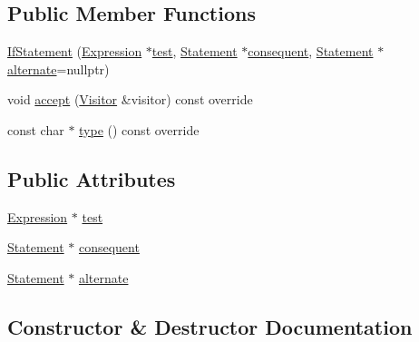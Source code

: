 \subsection*{Public Member Functions}
\begin{DoxyCompactItemize}
\item 
\hyperlink{struct_if_statement_aa34756942dc6b3c68abd60f697ea2237}{If\+Statement} (\hyperlink{struct_expression}{Expression} $\ast$\hyperlink{struct_if_statement_ab7d44c6a4d1e70ab2d1053a2b076b8df}{test}, \hyperlink{struct_statement}{Statement} $\ast$\hyperlink{struct_if_statement_a83d873df742779675de067315792ff8a}{consequent}, \hyperlink{struct_statement}{Statement} $\ast$\hyperlink{struct_if_statement_ab0ee82460f6279444d526b2fff26584b}{alternate}=nullptr)
\item 
void \hyperlink{struct_if_statement_a3b9cacb85a094dfe27646324769a1d2f}{accept} (\hyperlink{struct_visitor}{Visitor} \&visitor) const override
\item 
const char $\ast$ \hyperlink{struct_if_statement_a385e3770ad7768e8ccc370363d61dfe8}{type} () const override
\end{DoxyCompactItemize}
\subsection*{Public Attributes}
\begin{DoxyCompactItemize}
\item 
\hyperlink{struct_expression}{Expression} $\ast$ \hyperlink{struct_if_statement_ab7d44c6a4d1e70ab2d1053a2b076b8df}{test}
\item 
\hyperlink{struct_statement}{Statement} $\ast$ \hyperlink{struct_if_statement_a83d873df742779675de067315792ff8a}{consequent}
\item 
\hyperlink{struct_statement}{Statement} $\ast$ \hyperlink{struct_if_statement_ab0ee82460f6279444d526b2fff26584b}{alternate}
\end{DoxyCompactItemize}


\subsection{Constructor \& Destructor Documentation}
\mbox{\label{struct_if_statement_aa34756942dc6b3c68abd60f697ea2237}} 
